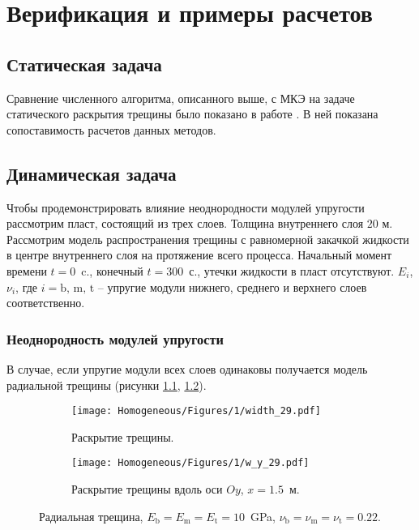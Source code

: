 \chapter{Верификация и примеры расчетов}
\label{sec:verification}

\section{Статическая задача}
\label{subsec:static-fracture}
Сравнение численного алгоритма, описанного выше, с МКЭ на задаче статического раскрытия трещины было показано в работе \cite{Peirce2001UniformAA}. В ней показана сопоставимость расчетов данных методов.



\section{Динамическая задача}
Чтобы продемонстрировать влияние неоднородности модулей упругости рассмотрим пласт, состоящий из трех слоев. Толщина внутреннего слоя $20$ м. Рассмотрим модель распространения трещины с равномерной закачкой жидкости в центре внутреннего слоя на протяжение всего процесса. Начальный момент времени $t = 0$~c., конечный $t = 300$~с., утечки жидкости в пласт отсутствуют. $E_i$, $\nu_i$, где $i=\text{b, m, t}$ -- упругие модули нижнего, среднего и верхнего слоев соответственно. 

\subsection{Неоднородность модулей упругости}
В случае, если упругие модули всех слоев одинаковы получается модель радиальной трещины (рисунки \ref{fig:homogeneous-planar}, \ref{fig:homogeneous-slice}).
\begin{figure}[htbp]
    \centering
    \begin{subfigure}[t]{0.4\textwidth}
        \centering
        \caption{Раскрытие трещины.}
        \label{fig:homogeneous-planar}
        \texttt{[image: Homogeneous/Figures/1/width\_29.pdf]}
    \end{subfigure}
    \hfill 
    \begin{subfigure}[t]{0.55\textwidth}
        \centering
        \caption{Раскрытие трещины вдоль оси $Oy$, $x=1.5$~м.}
        \label{fig:homogeneous-slice}
        \texttt{[image: Homogeneous/Figures/1/w\_y\_29.pdf]}
    \end{subfigure}
    \caption{Радиальная трещина, $E_\text{b} = E_\text{m} = E_\text{t} = 10$~GPa, $\nu_\text{b} = \nu_\text{m} = \nu_\text{t} = 0.22$.}
    \label{fig:homogeneous}
\end{figure}

